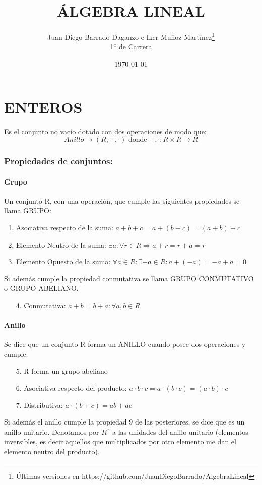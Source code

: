 \documentclass[10pt,a4paper,openright]{book}
\title{ÁLGEBRA LINEAL}
\author{Juan Diego Barrado Daganzo e Iker Muñoz Martínez\footnote{Últimas versiones en https://github.com/JuanDiegoBarrado/AlgebraLineal}\\1º de Carrera} %
\date{\today}
\begin{document}
\maketitle

\mainmatter
\chapter*{ENTEROS}
Es el conjunto no vacío dotado con dos operaciones de modo que:
$$Anillo \rightarrow (R,+,\cdot)\mbox{ donde }+,\cdot : R\times R \rightarrow R$$
\subsection*{\underline{Propiedades de conjuntos}:}
\subsubsection*{Grupo}
Un conjunto R, con una operación, que cumple las siguientes propiedades se llama GRUPO:
\begin{enumerate}
\item Asociativa respecto de la suma: $a+b+c=a+(b+c)=(a+b)+c$
\item Elemento Neutro de la suma: $\exists a : \forall r \in R \Rightarrow a+r=r+a=r$
\item Elemento Opuesto de la suma: $\forall a \in R : \exists -a\in R : a+(-a)=-a+a=0$
\end{enumerate}
Si además cumple la propiedad conmutativa se llama GRUPO CONMUTATIVO o GRUPO ABELIANO.
\begin{enumerate}
\item[4.] Conmutativa: $a+b=b+a: \forall a,b\in R $
\end{enumerate}

\subsubsection*{Anillo}
Se dice que un conjunto R forma un ANILLO cuando posee dos operaciones y cumple:
\begin{enumerate}
\item [5.]R forma un grupo abeliano
\item [6.]Asociativa respecto del producto: $a\cdot b\cdot c=a\cdot(b\cdot c)=(a\cdot b)\cdot c$
\item [7.]Distributiva: $a\cdot(b+c)=ab+ac$
\end{enumerate}
Si además el anillo cumple la propiedad 9 de las posteriores, se dice que es un anillo unitario. Denotamos por $R^{x}$ a las unidades del anillo unitario (elementos inversibles, es decir aquellos que multiplicados por otro elemento me dan el elemento neutro del producto).
\end{document}
